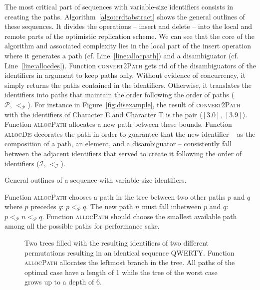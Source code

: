The most critical part of sequences with variable-size identifiers consists in
creating the paths. Algorithm~\ref{algo:crdtabstract} shows the general outlines
of these sequences. It divides the operations -- insert and delete -- into the
local and remote parts of the optimistic replication scheme. We can see that the
core of the algorithm and associated complexity lies in the local part of the
insert operation where it generates a path (cf. Line~\ref{line:allocpath}) and a
disambiguator (cf. Line~\ref{line:allocdes}). Function \textsc{convert2Path}
gets rid of the disambiguators of the identifiers in argument to keep paths
only. Without evidence of concurrency, it simply returns the paths contained in
the identifiers. Otherwise, it translates the identifiers into paths that
maintain the order following the order of paths
($\mathcal{P},\, <_{\mathcal{P}}$). For instance in Figure~\ref{fig:disexample},
the result of \textsc{convert2Path} with the identifiers of Character E and
Character T is the pair $\langle [3.0],\, [3.9]\rangle$. Function
\textsc{allocPath} allocates a new path between these bounds. Function
\textsc{allocDis} decorates the path in order to guarantee that the new
identifier -- as the composition of a path, an element, and a disambiguator --
consistently fall between the adjacent identifiers that served to create it
following the order of identifiers ($\mathcal{I}, \, <_\mathcal{I}$).

\begin{algorithm}[h]
  
  \caption{\label{algo:crdtabstract}General outlines of a sequence with
    variable-size identifiers.}
\end{algorithm}

Function \textsc{allocPath} chooses a path in the tree between two other paths
$p$ and $q$ where $p$ precedes $q$: $p<_{\mathcal{P}}q$. The new path $n$ must
fall inbetween $p$ and $q$: $p<_\mathcal{P}n<_\mathcal{P}q$. 
Function \textsc{allocPath} should choose the smallest available path among all
the possible paths for performance sake.

\begin{figure*}
  \centering
  \hspace{50pt}
  \caption{\label{fig:allocpathexample} Two trees filled with the resulting
    identifiers of two different permutations resulting in an identical sequence
    QWERTY. Function \textsc{allocPath} allocates the leftmost branch in the
    tree. All paths of the optimal case have a length of 1 while the tree of the
    worst case grows up to a depth of 6.}
\end{figure*}

